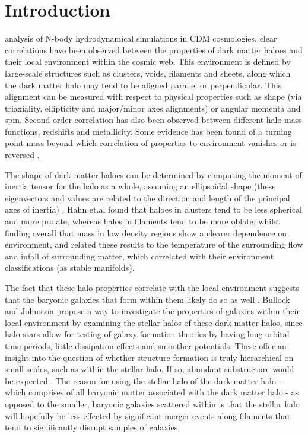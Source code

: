 \documentclass[journal]{IEEEtran}
\begin{document}
\section{Introduction}
 analysis of N-body hydrodynamical simulations in CDM cosmologies, clear correlations have been observed between the properties of dark matter haloes and their local environment within the cosmic web. This environment is defined by large-scale structures such as clusters, voids, filaments and sheets, along which the dark matter halo may tend to be aligned parallel or perpendicular. This alignment can be measured with respect to physical properties such as shape (via triaxiality, ellipticity and major/minor axes alignments) or angular momenta and spin. Second order correlation has also been observed between different halo mass functions, redshifts and metallicity. Some evidence has been found of a turning point mass beyond which correlation of properties to environment vanishes or is reversed \cite{hahn07b} \cite{dubois14}. 

The shape of dark matter haloes can be determined by computing the moment of inertia tensor for the halo as a whole, assuming an ellipsoidal shape (these eigenvectors and values are related to the direction and length of the principal axes of inertia) \cite{hahn07a}. Hahn et.al \cite{hahn07a} found that haloes in clusters tend to be less spherical and more prolate, whereas halos in filaments tend to be more oblate, whilst finding overall that mass in low density regions show a clearer dependence on environment, and related these results to the temperature of the surrounding flow and infall of surrounding matter, which correlated with their environment classifications (as stable manifolds). 

The fact that these halo properties correlate with the local environment suggests that the baryonic galaxies that form within them likely do so as well \cite{hahn07b}.  Bullock and Johnston \cite{bullock05} propose a way to investigate the properties of galaxies within their local environment by examining the stellar halos of these dark matter halos, since halo stars allow for testing of galaxy formation theories by having long orbital time periods, little dissipation effects and smoother potentials. These offer an insight into the question of whether structure formation is truly hierarchical on small scales, such as within the stellar halo. If so, abundant substructure would be expected \cite{bullock05}. The reason for using the stellar halo of the dark matter halo - which comprises of all baryonic matter associated with the dark matter halo - as opposed to the smaller, baryonic galaxies scattered within is that the stellar halo will hopefully be less effected by significant merger events along filaments that tend to significantly disrupt samples of galaxies.
\end{document}
